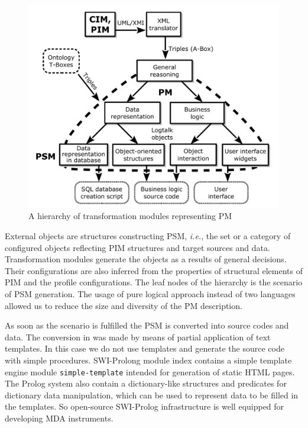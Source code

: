 \documentclass[runningheads]{llncs}
\begin{document}
\begin{figure}[t]
  \centering
  \includegraphics[width=1\linewidth]{architect_tree_pres-en-wo-OCL.pdf}
  \caption{A hierarchy of transformation modules representing PM}
  \label{fig:modules}
\end{figure}

External objects are structures constructing PSM, \emph{i.e.}, the set or a category of configured objects reflecting PIM structures and target sources and data.  Transformation modules generate the objects as a results of general decisions.  Their configurations are also inferred from the properties of structural elements of PIM and the profile configurations.  The leaf nodes of the hierarchy is the scenario of PSM generation.  The usage of pure logical approach instead of two languages allowed us to reduce the size and diversity of the PM description.

As soon as the scenario is fulfilled the PSM is converted into source codes and data.  The conversion in \cite{tereh1} was made by means of partial application of text templates.  In this case we do not use templates and generate the source code with simple procedures.  SWI-Prolong module index contains a simple template engine module \texttt{simple-template} intended for generation of static HTML pages.  The Prolog system also contain a dictionary-like structures and predicates for dictionary data manipulation, which can be used to represent data to be filled in the templates.  So open-source SWI-Prolog infrastructure is well equipped for developing MDA instruments.
\end{document}
